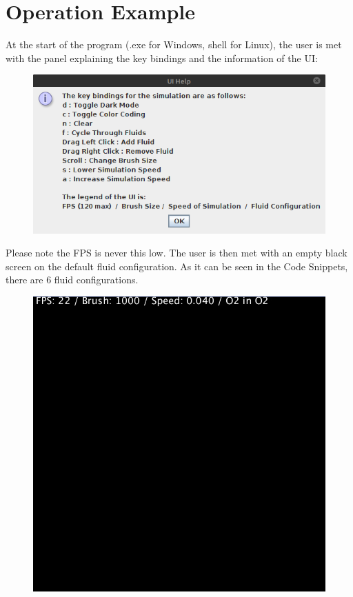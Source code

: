 \documentclass[12pt,a4paper]{book}
\begin{document}
\chapter{Operation Example}
At the start of the program (.exe for Windows, shell for Linux), the user is met with the panel explaining the key bindings and the information of the UI:

\begin{figure}[H]
	\includegraphics[scale=0.5]{pics/0.png}
\end{figure}

\pagebreak

Please note the FPS is never this low. The user is then met with an empty black screen on the default fluid configuration. As it can be seen in the Code Snippets, there are 6 fluid configurations.

\begin{figure}[H]
	\includegraphics[scale=0.5]{pics/blank.png}
\end{figure}
\end{document}
